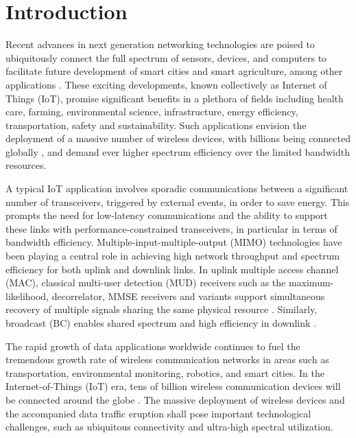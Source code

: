 \chapter{Introduction}
\label{chap:intro}


Recent advances in next generation networking technologies are poised to ubiquitously connect the full spectrum of sensors, devices, and computers to facilitate future development of smart cities and smart agriculture, among other applications \cite{AlFuqaha2015IoTsurvey}.
These exciting developments, known collectively as Internet of Things (IoT), promise significant benefits in a plethora of fields including health care, farming, environmental science, infrastructure, energy efficiency, transportation, safety and sustainability. Such applications envision the deployment of a massive number of wireless devices, with billions being connected globally \cite{Qualcomm15, Andrews14}, and demand ever higher spectrum efficiency over the limited bandwidth resources.

A typical IoT application involves sporadic communications between a significant number of transceivers, triggered by external events, in order to save energy. 
This prompts the need for low-latency communications and the ability to support these links with performance-constrained transceivers, in particular in terms of bandwidth efficiency. 
Multiple-input-multiple-output (MIMO) technologies have been playing a central role in achieving high
network throughput and spectrum efficiency \cite{LTE12} for both uplink and downlink links.
In uplink multiple access channel (MAC), classical multi-user detection (MUD) receivers such as the maximum-likelihood, decorrelator, MMSE receivers and variants support simultaneous recovery of multiple signals sharing the same physical resource
\cite{Verdu1986a,Vandenameele00, Hanzo03,Verdu1986b, Xu02,Verdu89, Xie90, Madhow94,Heath05}. Similarly, broadcast (BC) enables shared spectrum and high efficiency in downlink \cite{mu-mimo2012}.

The rapid growth of data applications worldwide continues to fuel the tremendous growth rate of wireless communication networks in areas such as transportation, environmental monitoring, robotics, and smart cities. 
In the Internet-of-Things (IoT) era, tens of billion wireless communication devices will be connected around the globe \cite{Qualcomm15, Andrews14}. 
The massive deployment of wireless devices and the accompanied data traffic eruption shall pose important technological challenges, such as ubiquitous connectivity and ultra-high spectral utilization.


